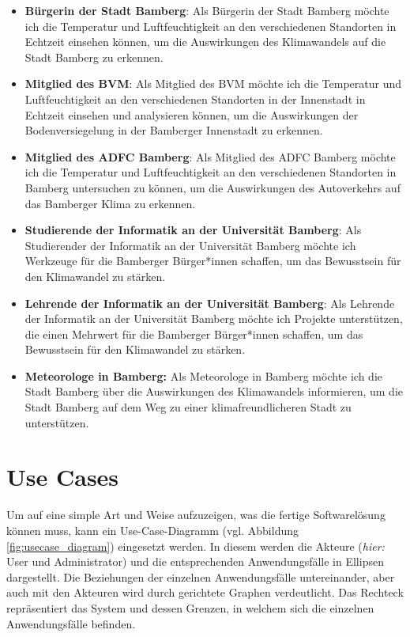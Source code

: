 \begin{itemize}
    \item \textbf{Bürgerin der Stadt Bamberg}: Als Bürgerin der Stadt Bamberg möchte ich die Temperatur und Luftfeuchtigkeit an den verschiedenen Standorten in Echtzeit einsehen können, um die Auswirkungen des Klimawandels auf die Stadt Bamberg zu erkennen.
    \item \textbf{Mitglied des \ac{BVM}}: Als Mitglied des \ac{BVM} möchte ich die Temperatur und Luftfeuchtigkeit an den verschiedenen Standorten in der Innenstadt in Echtzeit einsehen und analysieren können, um die Auswirkungen der Bodenversiegelung in der Bamberger Innenstadt zu erkennen.
    \item \textbf{Mitglied des \ac{ADFC} Bamberg}: Als Mitglied des \ac{ADFC} Bamberg möchte ich die Temperatur und Luftfeuchtigkeit an den verschiedenen Standorten in Bamberg untersuchen zu können, um die Auswirkungen des Autoverkehrs auf das Bamberger Klima zu erkennen.
    \item \textbf{Studierende der Informatik an der Universität Bamberg}: Als Studierender der Informatik an der Universität Bamberg möchte ich Werkzeuge für die Bamberger Bürger*innen schaffen, um das Bewusstsein für den Klimawandel zu stärken.
    \item \textbf{Lehrende der Informatik an der Universität Bamberg}: Als Lehrende der Informatik an der Universität Bamberg möchte ich Projekte unterstützen, die einen Mehrwert für die Bamberger Bürger*innen schaffen, um das Bewusstsein für den Klimawandel zu stärken.
    \item \textbf{Meteorologe in Bamberg:} Als Meteorologe in Bamberg möchte ich die Stadt Bamberg über die Auswirkungen des Klimawandels informieren, um die Stadt Bamberg auf dem Weg zu einer klimafreundlicheren Stadt zu unterstützen.
\end{itemize}

\section{Use Cases}
Um auf eine simple Art und Weise aufzuzeigen, was die fertige Softwarelösung können muss, kann ein Use-Case-Diagramm (vgl. Abbildung \ref{fig:usecase_diagram}) eingesetzt werden. In diesem werden die Akteure (\textit{hier:} User und Administrator) und die entsprechenden Anwendungsfälle in Ellipsen dargestellt. Die Beziehungen der einzelnen Anwendungsfälle untereinander, aber auch mit den Akteuren wird durch gerichtete Graphen verdeutlicht. Das Rechteck repräsentiert das System und dessen Grenzen, in welchem sich die einzelnen Anwendungsfälle befinden. 


